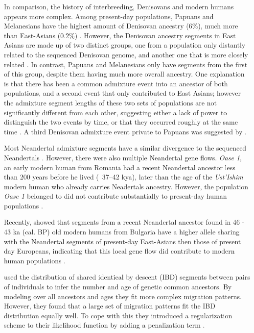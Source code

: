 In comparison, the history of interbreeding, Denisovans and modern humans appears more complex. Among present-day populations, Papuans and Melanesians have the highest amount of Denisovan ancestry (6\%), much more than East-Asians (0.2\%) \citep{reich_genetic_2010,meyer_high-coverage_2012}.
However, the Denisovan ancestry segments in East Asians are made up of two distinct groups, one from a population only distantly related to the sequenced Denisovan genome, and another one that is more closely related \citep{browning_analysis_2018}. In contrast, Papuans and Melanesians only have segments from the first of this group, despite them having much more overall ancestry.
One explanation is that there has been a common admixture event into an ancestor of both populations, and a second event that only contributed to East Asians; however the admixture segment lengths of these two sets of populations are not significantly different from each other, suggesting either a lack of power to distinguish the two events by time, or that they occurred roughly at the same time \citep{browning_analysis_2018}. A third  Denisovan admixture event private to Papuans was suggested by \cite{jacobs_multiple_2019}.


Most Neandertal admixture segments have a similar divergence to the sequenced Neandertals \citep{browning_analysis_2018}. However, there were also multiple Neandertal gene flows. \textit{Oase 1}, an early modern human from Romania had a recent Neandertal ancestor less than 200 years before he lived (~37–42 kya), later than the age of the \textit{Ust'Ishim} modern human who already carries Neadertals ancestry. However, the population \textit{Oase 1}  belonged to did  not contribute substantially to present-day human populations  \citep{fu_genome_2014,fu_early_2015}.

Recently, \cite{hajdinjak_early_2021} showed that segments from a recent Neandertal ancestor found in  46 - 43 ka (cal. BP) old modern humans from Bulgaria have a higher allele sharing with the Neandertal segments of present-day East-Asians then those of present day Europeans, indicating that this local gene flow did contribute to modern human populations \citep{hajdinjak_early_2021}.  



\cite{ralph_geography_2013} used the distribution of shared identical by descent (IBD)  segments between pairs of individuals to infer the number and age of genetic common ancestors. By modeling over all ancestors and ages they fit more complex migration patterns. However, they found that a large set of migration patterns fit the IBD distribution equally well. To cope with this they introduced a regularization scheme to their likelihood function by adding a penalization term \citep{ralph_geography_2013}.

